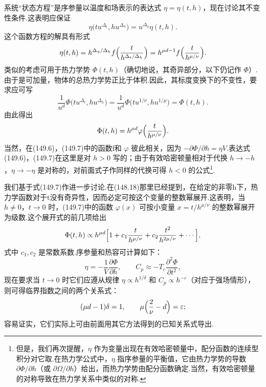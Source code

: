 系统“状态方程”是序参量以温度和场表示的表达式 $\eta=\eta(t,h)$，现在讨论其不变性条件.这表明应保证
\begin{equation*}
  \eta\bigl(tu^{\Delta_t},hu^{\Delta_h}\bigr)
  =u^{\Delta_\eta}\eta(t,h).
\end{equation*}
这个函数方程的解具有形式
\begin{equation}
  \eta(t,h)=h^{\Delta_\eta/\Delta_h}
  f\Bigl(\frac{t}{h^{\Delta_t/\Delta_h}}\Bigr)
  =h^{\mu d-1}f\Bigl(\frac{t}{h^{\mu/\nu}}\Bigr).
\end{equation}
类似的考虑可用于热力学势 $\Phi(t,h)$（确切地说，其奇异部分，以下仍记作 $\Phi$）.由于是可加量，物体的总热力学势正比于体积.因此，其标度变换下的不变性，要求应可写
\begin{equation*}
  \frac{1}{u^d}\Phi\bigl(tu^{\Delta_t},hu^{\Delta_h}\bigr)
  =\frac{1}{u^d}\Phi\bigl(tu^{1/\nu},hu^{1/\mu}\bigr)
  =\Phi(t,h).
\end{equation*}
由此得出
\begin{equation}
  \Phi(t,h)=h^{\mu d}\varphi\Bigl(\frac{t}{h^{\mu/\nu}}\Bigr).
\end{equation}
当然，在(149.6)，(149.7)中的函数f和 $\varphi$ 彼此相关，因为 $-\partial\Phi/\partial h=\eta V$.表达式(149.6)，(149.7)在这里是对 $h>0$ 写的；由于有效哈密顿量相对于代换 $h\to-h$，$\eta\to-\eta$ 是对称的，对前面式子作同样的代换可得 $h<0$ 的公式\footnote{但是，我们再次提醒，$\eta$ 作为变量出现在有效哈密顿量中，配分函数的连续型积分对它取.在热力学公式中，$\eta$ 指序参量的平衡值，它由热力学势的导数 $\partial\Phi/\partial h$（或 $\partial\Omega/\partial h$）给出，而热力学势由配分函数确定.当然，有效哈密顿量的对称导致在热力学关系中类似的对称.}.

我们基于式(149.7)作进一步讨论.在(148.18)那里已经提到，在给定的非零h下，热力学函数对于t没有奇异性，因而必定可按这个变量的整数幂展开.这表明，当 $h\neq0$，$t\to0$ 时，(149.7)中的函数 $\varphi(x)$ 可按小变量 $x=t/h^{\mu/\nu}$ 的整数幂展开为级数.这个展开式的前几项给出
\begin{equation}
  \Phi(t,h)\propto h^{\mu d}
  \Bigl[1+c_1\frac{t}{h^{\mu/\nu}}
  +c_2\frac{t^2}{h^{2\mu/\nu}}+\cdots\Bigr],
\end{equation}
式中 $c_1,c_2$ 是常数系数.序参量和热容可计算如下：
\begin{equation*}
  \eta=-\frac{1}{V}\frac{\partial\Phi}{\partial h},\qquad
  C_p\approx-T_c\frac{\partial^2\Phi}{\partial t^2},
\end{equation*}
现在要求当 $t\to0$ 时它们应遵从规律 $\eta\propto h^{1/\delta}$ 和 $C_p\propto h^{-\varepsilon}$（对应于强场情形），则可得临界指数之间的两个关系式：
\begin{equation*}
  (\mu d-1)\delta=1,\qquad
  \mu\Bigl(\frac{2}{\nu}-d\Bigr)=\varepsilon;
\end{equation*}
容易证实，它们实际上可由前面用其它方法得到的已知关系式导出.

